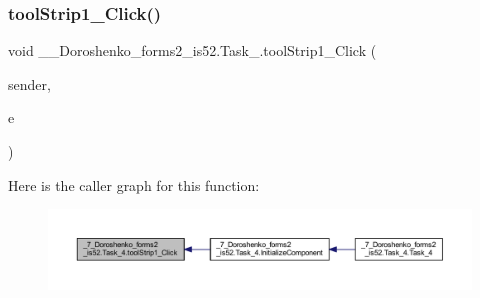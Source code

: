 \hypertarget{class__7___doroshenko__forms2__is52_1_1_task__4_a00ac51fb084a1fd508ea614f54cbe2ab}{}\label{class__7___doroshenko__forms2__is52_1_1_task__4_a00ac51fb084a1fd508ea614f54cbe2ab} 
\subsubsection{\texorpdfstring{tool\+Strip1\+\_\+\+Click()}{toolStrip1\_Click()}}
{\footnotesize\ttfamily void \+\_\+\_\+\+Doroshenko\+\_\+forms2\+\_\+is52.\+Task\+\_.\+tool\+Strip1\+\_\+\+Click (\begin{DoxyParamCaption}\item[{object}]{sender,  }\item[{Event\+Args}]{e }\end{DoxyParamCaption})\hspace{0.3cm}{\ttfamily [private]}}

Here is the caller graph for this function\+:
\nopagebreak
\begin{figure}[H]
\begin{center}
\leavevmode
\includegraphics[width=350pt]{class__7___doroshenko__forms2__is52_1_1_task__4_a00ac51fb084a1fd508ea614f54cbe2ab_icgraph}
\end{center}
\end{figure}
\hypertarget{class__7___doroshenko__forms2__is52_1_1_task__4_aba2d8d643ee983311563a099f5f0ac12}{}\label{class__7___doroshenko__forms2__is52_1_1_task__4_aba2d8d643ee983311563a099f5f0ac12} 
